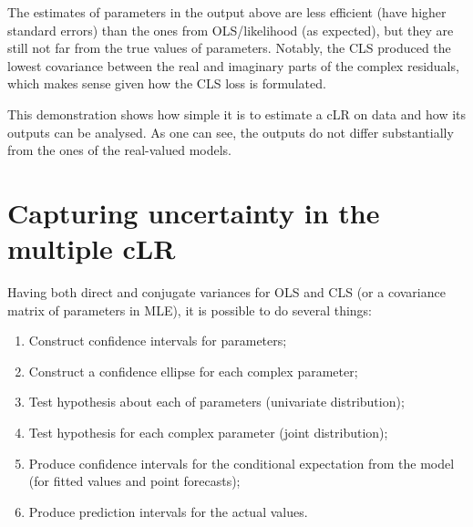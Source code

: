 \documentclass[
]{book}
\providecommand{\tightlist}{%
  \setlength{\itemsep}{0pt}\setlength{\parskip}{0pt}}
\begin{document}
The estimates of parameters in the output above are less efficient (have higher standard errors) than the ones from OLS/likelihood (as expected), but they are still not far from the true values of parameters. Notably, the CLS produced the lowest covariance between the real and imaginary parts of the complex residuals, which makes sense given how the CLS loss is formulated.

This demonstration shows how simple it is to estimate a cLR on data and how its outputs can be analysed. As one can see, the outputs do not differ substantially from the ones of the real-valued models.

\hypertarget{capturing-uncertainty-in-the-multiple-clr}{%
\section{Capturing uncertainty in the multiple cLR}\label{capturing-uncertainty-in-the-multiple-clr}}

Having both direct and conjugate variances for OLS and CLS (or a covariance matrix of parameters in MLE), it is possible to do several things:

\begin{enumerate}
\def\labelenumi{\arabic{enumi}.}
\tightlist
\item
  Construct confidence intervals for parameters;
\item
  Construct a confidence ellipse for each complex parameter;
\item
  Test hypothesis about each of parameters (univariate distribution);
\item
  Test hypothesis for each complex parameter (joint distribution);
\item
  Produce confidence intervals for the conditional expectation from the model (for fitted values and point forecasts);
\item
  Produce prediction intervals for the actual values.
\end{enumerate}
\end{document}
